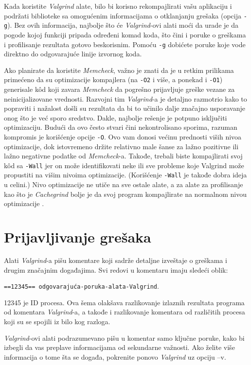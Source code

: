 \documentclass[12pt,oneside]{memoir}
\theoremstyle{plain}
\theoremstyle{definition}
\begin{document}
Kada koristite \textit{Valgrind} alate, bilo bi korisno rekompajlirati vašu aplikaciju i podržati biblioteke sa omogućenim informacijama o otklanjanju grešaka (opcija \texttt{-g}). Bez ovih informacija, najbolje što će \textit{Valgrind}-ovi alati  moći da urade je da pogode kojoj funkciji pripada određeni komad koda, što čini i poruke o greškama i profilisanje rezultata gotovo beskorisnim. Pomoću \texttt{-g} dobićete poruke koje vode direktno do odgovarajuće linije izvornog koda.

Ako planirate da koristite \textit{Memcheck}, važno je znati da je u retkim prilikama primećeno da su optimizacije kompajlera (na \texttt{-O2} i više, a ponekad i \texttt{-O1}) generisale k\^od koji zavara \textit{Memcheck} da pogrešno prijavljuje greške vezane za neinicijalizovane vrednosti. Razvojni tim \textit{Valgrind}-a je detaljno razmotrio kako to popraviti i nažalost došli su rezultata  da bi to učinilo dalje značajno usporavanje onog što je već sporo sredstvo. Dakle, najbolje rešenje je potpuno isključiti optimizaciju. Budući da ovo često stvari čini nekontrolisano sporima, razuman kompromis je korišćenje opcije \texttt{-O}. Ovo vam donosi većinu prednosti viših nivoa optimizacije, dok istovremeno držite relativno male šanse za lažno pozitivne ili lažno negativne podatke od \textit{Memcheck}-a. Takođe, trebali biste kompajlirati svoj k\^od sa \texttt{-Wall} jer on može identifikovati neke ili sve probleme koje Valgrind može propustiti na višim nivoima optimizacije. (Korišćenje \texttt{-Wall} je takođe dobra ideja u celini.) Nivo optimizacije ne utiče na sve ostale alate, a za alate za profilisanje kao što je \textit{Cachegrind} bolje je da svoj program kompajlirate na normalnom nivou optimizacije \cite{ValgrindCore}. 

\section{Prijavljivanje grešaka}
Alati \textit{Valgrind}-a pišu komentare koji sadrže detaljne izveštaje o greškama i drugim značajnim događajima. Svi redovi u komentaru imaju sledeći oblik:
\begin{center}
\texttt{==12345== odgovarajuća-poruka-alata-Valgrind}.
\end{center}
12345 je ID procesa. Ova šema olakšava razlikovanje izlaznih rezultata programa od komentara \textit{Valgrind}-a, a takođe i razlikovanje komentara od različitih procesa koji su se spojili iz bilo kog razloga.

\textit{Valgrind}-ovi alati podrazumevano pišu u komentar samo ključne poruke, kako bi izbegli da vas preplave informacijama od sekundarne važnosti. Ako želite više informacija o tome šta se događa, pokrenite ponovo \textit{Valgrind} uz opciju –v.
\end{document}
